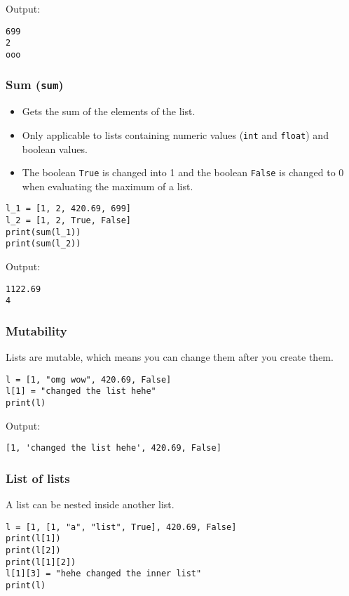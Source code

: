 \documentclass[11pt]{article}
\begin{document}
 \noindent Output:

\label{org104fd28}
\begin{verbatim}
699
2
ooo
\end{verbatim}
\subsubsection{Sum (\texttt{sum})}
\label{sec:org7556657}
\begin{itemize}
\item Gets the sum of the elements of the list.
\item Only applicable to lists containing numeric values (\texttt{int} and \texttt{float}) and boolean values.
\item The boolean \texttt{True} is changed into 1 and the boolean \texttt{False} is changed to 0 when evaluating the maximum of a list.
\end{itemize}

\begin{verbatim}
l_1 = [1, 2, 420.69, 699]
l_2 = [1, 2, True, False]
print(sum(l_1))
print(sum(l_2))
\end{verbatim}

 \noindent Output:

\label{org577b91a}
\begin{verbatim}
1122.69
4
\end{verbatim}
\subsubsection{Mutability}
\label{sec:orgdaa2ac4}
Lists are mutable, which means you can change them after you create them.
\begin{verbatim}
l = [1, "omg wow", 420.69, False]
l[1] = "changed the list hehe"
print(l)
\end{verbatim}

 \noindent Output:

\label{org526531d}
\begin{verbatim}
[1, 'changed the list hehe', 420.69, False]
\end{verbatim}
\subsubsection{List of lists}
\label{sec:org641b704}
A list can be nested inside another list.
\begin{verbatim}
l = [1, [1, "a", "list", True], 420.69, False]
print(l[1])
print(l[2])
print(l[1][2])
l[1][3] = "hehe changed the inner list"
print(l)
\end{verbatim}
\end{document}
